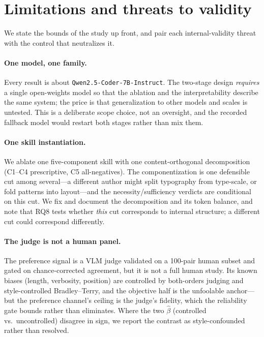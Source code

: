 \section{Limitations and threats to validity}
\label{sec:limitations}

We state the bounds of the study up front, and pair each internal-validity threat with the control
that neutralizes it.

\paragraph{One model, one family.} Every result is about \texttt{Qwen2.5-Coder-7B-Instruct}. The
two-stage design \emph{requires} a single open-weights model so that the ablation and the
interpretability describe the same system; the price is that generalization to other models and
scales is untested. This is a deliberate scope choice, not an oversight, and the recorded fallback
model would restart both stages rather than mix them.

\paragraph{One skill instantiation.} We ablate one five-component skill with one content-orthogonal
decomposition (C1--C4 prescriptive, C5 all-negatives). The componentization is one defensible cut
among several---a different author might split typography from type-scale, or fold patterns into
layout---and the necessity/sufficiency verdicts are conditional on this cut. We fix and document the
decomposition and its token balance, and note that RQ8 tests whether \emph{this} cut corresponds to
internal structure; a different cut could correspond differently.

\paragraph{The judge is not a human panel.} The preference signal is a VLM judge validated on a
100-pair human subset and gated on chance-corrected agreement, but it is not a full human study. Its
known biases (length, verbosity, position) are controlled by both-orders judging and style-controlled
Bradley--Terry, and the objective half is the unfoolable anchor---but the preference channel's ceiling
is the judge's fidelity, which the reliability gate bounds rather than eliminates. Where the two
$\hat\beta$ (controlled vs.\ uncontrolled) disagree in sign, we report the contrast as style-confounded
rather than resolved.

